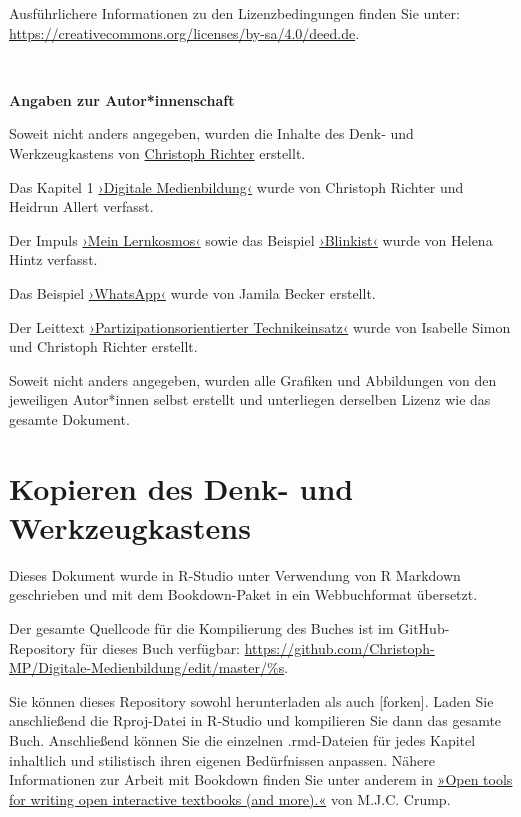 \documentclass[
  a4paper,
]{book}
\begin{document}
Ausführlichere Informationen zu den Lizenzbedingungen finden Sie unter: \url{https://creativecommons.org/licenses/by-sa/4.0/deed.de}.

~

\textbf{Angaben zur Autor*innenschaft}

Soweit nicht anders angegeben, wurden die Inhalte des Denk- und Werkzeugkastens von \href{Mailto:richter@paedagogik.uni-kiel.de}{Christoph Richter} erstellt.

Das Kapitel 1 \hyperref[digitale-medienbildung]{›Digitale Medienbildung‹} wurde von Christoph Richter und Heidrun Allert verfasst.

Der Impuls \hyperref[mein-lernkosmos]{›Mein Lernkosmos‹} sowie das Beispiel \hyperref[beispiel-blinkist]{›Blinkist‹} wurde von Helena Hintz verfasst.

Das Beispiel \hyperref[beispiel-whatsapp]{›WhatsApp‹} wurde von Jamila Becker erstellt.

Der Leittext \hyperref[partizipationsorientierter-technikeinsatz]{›Partizipationsorientierter Technikeinsatz‹} wurde von Isabelle Simon und Christoph Richter erstellt.

Soweit nicht anders angegeben, wurden alle Grafiken und Abbildungen von den jeweiligen Autor*innen selbst erstellt und unterliegen derselben Lizenz wie das gesamte Dokument.

\section{Kopieren des Denk- und Werkzeugkastens}\label{kopieren-des-denk--und-werkzeugkastens}

Dieses Dokument wurde in R-Studio unter Verwendung von R Markdown geschrieben und mit dem Bookdown-Paket in ein Webbuchformat übersetzt.

Der gesamte Quellcode für die Kompilierung des Buches ist im GitHub-Repository für dieses Buch verfügbar: \url{https://github.com/Christoph-MP/Digitale-Medienbildung/edit/master/\%s}.

Sie können dieses Repository sowohl herunterladen als auch {[}forken{]}. Laden Sie anschließend die Rproj-Datei in R-Studio und kompilieren Sie dann das gesamte Buch. Anschließend können Sie die einzelnen .rmd-Dateien für jedes Kapitel inhaltlich und stilistisch ihren eigenen Bedürfnissen anpassen. Nähere Informationen zur Arbeit mit Bookdown finden Sie unter anderem in \href{https://www.crumplab.com/OER_bookdown/}{»Open tools for writing open interactive textbooks (and more).«} von M.J.C. Crump.
\end{document}
